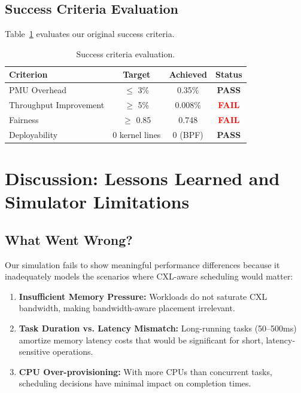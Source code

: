 \documentclass[11pt]{article}
\begin{document}
\subsection{Success Criteria Evaluation}

Table~\ref{tab:criteria} evaluates our original success criteria.

\begin{table}[t]
\caption{Success criteria evaluation.}
\label{tab:criteria}
\centering
\begin{tabular}{lccc}
\toprule
Criterion & Target & Achieved & Status \\
\midrule
PMU Overhead & $\leq$ 3\% & 0.35\% & \textcolor{green!60!black}{\textbf{PASS}} \\
Throughput Improvement & $\geq$ 5\% & 0.008\% & \textcolor{red}{\textbf{FAIL}} \\
Fairness & $\geq$ 0.85 & 0.748 & \textcolor{red}{\textbf{FAIL}} \\
Deployability & 0 kernel lines & 0 (BPF) & \textcolor{green!60!black}{\textbf{PASS}} \\
\bottomrule
\end{tabular}
\end{table}

\section{Discussion: Lessons Learned and Simulator Limitations}

\subsection{What Went Wrong?}

Our simulation fails to show meaningful performance differences because it inadequately models the scenarios where CXL-aware scheduling would matter:

\begin{enumerate}
    \item \textbf{Insufficient Memory Pressure:} Workloads do not saturate CXL bandwidth, making bandwidth-aware placement irrelevant.
    
    \item \textbf{Task Duration vs. Latency Mismatch:} Long-running tasks (50--500ms) amortize memory latency costs that would be significant for short, latency-sensitive operations.
    
    \item \textbf{CPU Over-provisioning:} With more CPUs than concurrent tasks, scheduling decisions have minimal impact on completion times.
\end{enumerate}
\end{document}
